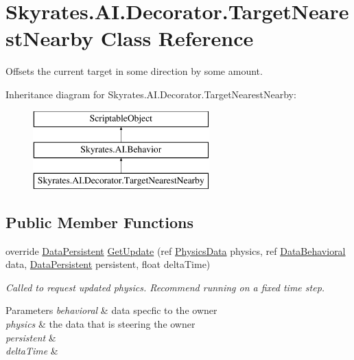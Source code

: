 \hypertarget{class_skyrates_1_1_a_i_1_1_decorator_1_1_target_nearest_nearby}{\section{Skyrates.\-A\-I.\-Decorator.\-Target\-Nearest\-Nearby Class Reference}
\label{class_skyrates_1_1_a_i_1_1_decorator_1_1_target_nearest_nearby}
}


Offsets the current target in some direction by some amount.  


Inheritance diagram for Skyrates.\-A\-I.\-Decorator.\-Target\-Nearest\-Nearby\-:\begin{figure}[H]
\begin{center}
\leavevmode
\includegraphics[height=3.000000cm]{class_skyrates_1_1_a_i_1_1_decorator_1_1_target_nearest_nearby}
\end{center}
\end{figure}
\subsection*{Public Member Functions}
\begin{DoxyCompactItemize}
\item 
\hypertarget{class_skyrates_1_1_a_i_1_1_decorator_1_1_target_nearest_nearby_af0f02c87a05ff96ffa7b456246077b47}{override \hyperlink{class_skyrates_1_1_a_i_1_1_behavior_1_1_data_persistent}{Data\-Persistent} \hyperlink{class_skyrates_1_1_a_i_1_1_decorator_1_1_target_nearest_nearby_af0f02c87a05ff96ffa7b456246077b47}{Get\-Update} (ref \hyperlink{class_skyrates_1_1_physics_1_1_physics_data}{Physics\-Data} physics, ref \hyperlink{class_skyrates_1_1_a_i_1_1_behavior_1_1_data_behavioral}{Data\-Behavioral} data, \hyperlink{class_skyrates_1_1_a_i_1_1_behavior_1_1_data_persistent}{Data\-Persistent} persistent, float delta\-Time)}\label{class_skyrates_1_1_a_i_1_1_decorator_1_1_target_nearest_nearby_af0f02c87a05ff96ffa7b456246077b47}

\begin{DoxyCompactList}\small\item\em Called to request updated physics. Recommend running on a fixed time step. 


\begin{DoxyParams}{Parameters}
{\em behavioral} & data specfic to the owner\\
\hline
{\em physics} & the data that is steering the owner\\
\hline
{\em persistent} & \\
\hline
{\em delta\-Time} & \\
\hline
\end{DoxyParams}
 \end{DoxyCompactList}\end{DoxyCompactItemize}
